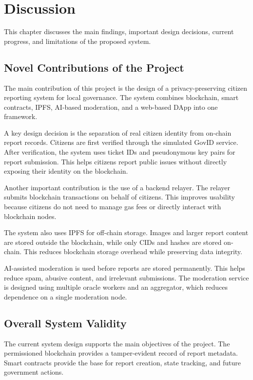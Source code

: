 \chapter{Discussion}

This chapter discusses the main findings, important design decisions, current progress, and limitations of the proposed system.

\section{Novel Contributions of the Project}

The main contribution of this project is the design of a privacy-preserving citizen reporting system for local governance. The system combines blockchain, smart contracts, IPFS, AI-based moderation, and a web-based DApp into one framework.

A key design decision is the separation of real citizen identity from on-chain report records. Citizens are first verified through the simulated GovID service. After verification, the system uses ticket IDs and pseudonymous key pairs for report submission. This helps citizens report public issues without directly exposing their identity on the blockchain.

Another important contribution is the use of a backend relayer. The relayer submits blockchain transactions on behalf of citizens. This improves usability because citizens do not need to manage gas fees or directly interact with blockchain nodes.

The system also uses IPFS for off-chain storage. Images and larger report content are stored outside the blockchain, while only CIDs and hashes are stored on-chain. This reduces blockchain storage overhead while preserving data integrity.

AI-assisted moderation is used before reports are stored permanently. This helps reduce spam, abusive content, and irrelevant submissions. The moderation service is designed using multiple oracle workers and an aggregator, which reduces dependence on a single moderation node.

\section{Overall System Validity}

The current system design supports the main objectives of the project. The permissioned blockchain provides a tamper-evident record of report metadata. Smart contracts provide the base for report creation, state tracking, and future government actions.

